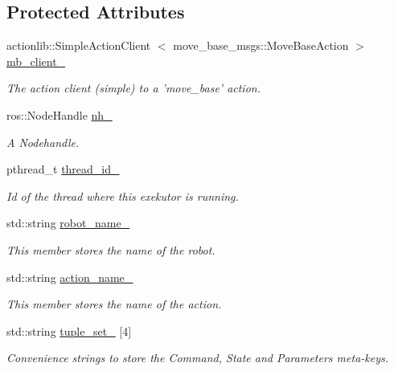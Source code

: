 \subsection*{\-Protected \-Attributes}
\begin{DoxyCompactItemize}
\item 
actionlib\-::\-Simple\-Action\-Client\*
$<$ move\-\_\-base\-\_\-msgs\-::\-Move\-Base\-Action $>$ \hyperlink{classexekutor_1_1MoveToExekutor_a8327c7f44d63874c74a3e2cd44a6c77a}{mb\-\_\-client\-\_\-}
\begin{DoxyCompactList}\small\item\em \-The action client (simple) to a 'move\-\_\-base' action. \end{DoxyCompactList}\item 
ros\-::\-Node\-Handle \hyperlink{classexekutor_1_1ActionExekutor_a1f0541608c4f27f3c72ab22b1874c882}{nh\-\_\-}
\begin{DoxyCompactList}\small\item\em \-A \-Nodehandle. \end{DoxyCompactList}\item 
pthread\-\_\-t \hyperlink{classexekutor_1_1ActionExekutor_a8d7e748c6d705da31eea62af6723ebca}{thread\-\_\-id\-\_\-}
\begin{DoxyCompactList}\small\item\em \-Id of the thread where this exekutor is running. \end{DoxyCompactList}\item 
std\-::string \hyperlink{classexekutor_1_1ActionExekutor_af165894bbbbabd62c17be857be095936}{robot\-\_\-name\-\_\-}
\begin{DoxyCompactList}\small\item\em \-This member stores the name of the robot. \end{DoxyCompactList}\item 
std\-::string \hyperlink{classexekutor_1_1ActionExekutor_ad0ab1bb7a2575962ee5fc9e2150c5d50}{action\-\_\-name\-\_\-}
\begin{DoxyCompactList}\small\item\em \-This member stores the name of the action. \end{DoxyCompactList}\item 
std\-::string \hyperlink{classexekutor_1_1ActionExekutor_a22f5cde3fe83eb147ec50c2d760b2d1f}{tuple\-\_\-set\-\_\-} \mbox{[}4\mbox{]}
\begin{DoxyCompactList}\small\item\em \-Convenience strings to store the \-Command, \-State and \-Parameters meta-\/keys. \end{DoxyCompactList}\end{DoxyCompactItemize}
